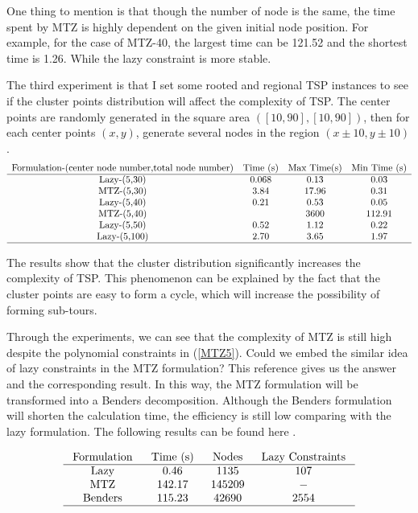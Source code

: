 \documentclass[12pt,letterpaper]{article}
\begin{document}
One thing to mention is that though the number of node is the same, the time spent by MTZ is highly dependent on the given initial node position. For example, for the case of MTZ-40, the largest time can be 121.52 and the shortest time is 1.26. While the lazy constraint is more stable.


The third experiment is that I set some rooted and regional TSP instances to see if the cluster points distribution will affect the complexity of TSP.
The center points are randomly generated in the square area $([10,90],[10,90])$, then for each center points $(x,y)$, generate several nodes in the region $(x\pm 10, y \pm 10)$.
$$
\begin{array}{cccc}
\text {Formulation-(center node number,total node number)} & \text {Time (s)} & \text {Max Time(s)} & \text {Min Time (s)} \\
\hline \text {Lazy-(5,30)} & 0.068 & 0.13 & 0.03 \\
\text {MTZ-(5,30)} & 3.84 & 17.96 & 0.31 \\
\text {Lazy-(5,40)} & 0.21 & 0.53 & 0.05 \\
\text {MTZ-(5,40)} &  & 3600 & 112.91\\
\text {Lazy-(5,50)} & 0.52 & 1.12  &  0.22\\
\text {Lazy-(5,100)} & 2.70 & 3.65 &  1.97\\
\hline
\end{array}
$$

The results show that the cluster distribution significantly increases the complexity of TSP.
This phenomenon can be explained by the fact that the cluster points are easy to form a cycle, which will increase the possibility of forming sub-tours.

Through the experiments, we can see that the complexity of MTZ is still high despite the polynomial constraints in (\ref{MTZ5}). Could we embed the similar idea of lazy constraints in the MTZ formulation? This reference gives us the answer and the corresponding result. In this way, the MTZ formulation will be transformed into a Benders decomposition. Although the Benders formulation will shorten the calculation time, the efficiency is still low comparing with the lazy formulation. The following results can be found here \cite{pearce2019towards}.

$$
\begin{array}{cccc}
\text { Formulation } & \text { Time (s) } & \text { Nodes } & \text { Lazy Constraints } \\
\hline \text { Lazy } & 0.46 & 1135 & 107 \\
\text { MTZ } & 142.17 & 145209 & - \\
\text { Benders } & 115.23 & 42690 & 2554 \\
\hline
\end{array}
$$
\end{document}

